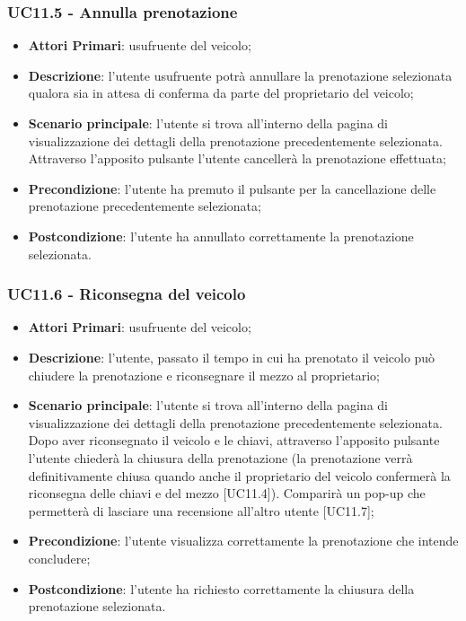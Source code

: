 \subsubsection{UC11.5 - Annulla prenotazione}
\begin{itemize}
	\item \textbf{Attori Primari}: usufruente del veicolo;
	\item \textbf{Descrizione}: l'utente usufruente potrà annullare la prenotazione selezionata qualora sia in attesa di conferma da parte del proprietario del veicolo;
	\item \textbf{Scenario principale}: l'utente si trova all'interno della pagina di visualizzazione dei dettagli della prenotazione precedentemente selezionata. Attraverso l'apposito pulsante l'utente cancellerà la prenotazione effettuata;
	\item \textbf{Precondizione}: l'utente ha premuto il pulsante per la cancellazione delle prenotazione precedentemente selezionata;
	\item \textbf{Postcondizione}: l'utente ha annullato correttamente la prenotazione selezionata.
\end{itemize}
\subsubsection{UC11.6 - Riconsegna del veicolo}
\begin{itemize}
	\item \textbf{Attori Primari}: usufruente del veicolo;
	\item \textbf{Descrizione}: l'utente, passato il tempo in cui ha prenotato il veicolo può chiudere la prenotazione e riconsegnare il mezzo al proprietario;
	\item \textbf{Scenario principale}: l'utente si trova all'interno della pagina di visualizzazione dei dettagli della prenotazione precedentemente selezionata. Dopo aver riconsegnato il veicolo e le chiavi, attraverso l'apposito pulsante l'utente chiederà la chiusura della prenotazione (la prenotazione verrà definitivamente chiusa quando anche il proprietario del veicolo confermerà la riconsegna delle chiavi e del mezzo [UC11.4]). Comparirà un pop-up che permetterà di lasciare una recensione all'altro utente [UC11.7];
	\item \textbf{Precondizione}: l'utente visualizza correttamente la prenotazione che intende concludere;
	\item \textbf{Postcondizione}: l'utente ha richiesto correttamente la chiusura della prenotazione selezionata.
\end{itemize}
